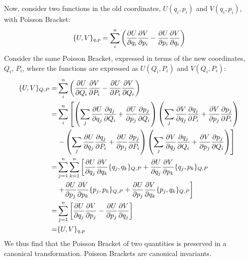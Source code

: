 Now, consider two functions in the old coordinates, $U(q_i,p_i)$ and $V(q_i,p_i)$, with Poisson Bracket:
\begin{align}
\{U,V\}_{q,p}=\sum_i^n\left(\die{U}{q_i}\die{V}{p_i}-\die{U}{p_i}\die{V}{q_i}\right)
\end{align}
Consider the same Poisson Bracket, expressed in terms of the new coordinates, $Q_i$, $P_i$, where the functions are expressed as $U(Q_i,P_i)$ and $V(Q_i,P_i)$:
\begin{align}
\{U,V\}_{Q,P}=&\sum_i^n\left(\die{U}{Q_i}\die{V}{P_i}-\die{U}{P_i}\die{V}{Q_i}\right)\nonumber\\
=&\sum_i^n\left[\left(\sum_j\die{U}{q_j}\die{q_j}{Q_i}+\die{U}{p_j}\die{p_j}{Q_i}\right)\left(\sum_j\die{V}{q_j}\die{q_j}{P_i}+\die{V}{p_j}\die{p_j}{P_i}\right) \right.\nonumber\\
&\left. -\left(\sum_j\die{U}{q_j}\die{q_j}{P_i}+\die{U}{p_j}\die{p_j}{P_i}\right)\left(\sum_j\die{V}{q_j}\die{q_j}{Q_i}+\die{V}{p_j}\die{p_j}{Q_i}\right)\right]\nonumber\\
=&\sum_{j=1}^n\sum_{k=1}^n\left[\die{U}{q_j}\die{V}{q_k}\{ q_j,q_k\}_{Q,P}+\die{U}{q_j}\die{V}{p_k}\{ q_j,p_k\}_{Q,P}\right.\nonumber\\
&\left. +\die{U}{p_j}\die{V}{p_k}\{ p_j,p_k\}_{Q,P}+\die{U}{p_j}\die{V}{q_k}\{p_j,q_k\}_{Q,P}\right ]\nonumber\\
=&\sum_{j=1}^n\left[\die{U}{q_j}\die{V}{p_j}-\die{U}{p_j}\die{V}{q_j}\right ]\nonumber\\
=&\{U,V\}_{q,p}
\end{align}
We thus find that the Poisson Bracket of two quantities is preserved in a canonical transformation. Poisson Brackets are canonical invariants.


